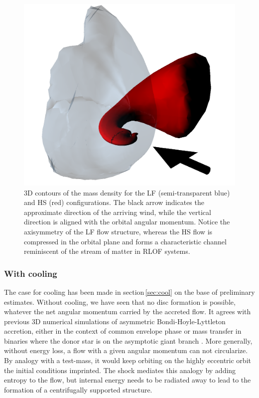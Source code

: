 \documentclass{aa}
\makeatletter
\newcommand*{\rlof}{RLOF\@\xspace}
\makeatother
\begin{document}
\begin{figure}
\centering
\includegraphics[width=0.99\columnwidth]{Pictures/iso-rho_adiab.png}
\caption{3D contours of the mass density for the LF (semi-transparent blue) and HS (red) configurations. The black arrow indicates the approximate direction of the arriving wind, while the vertical direction is aligned with the orbital angular momentum. Notice the axisymmetry of the LF flow structure, whereas the HS flow is compressed in the orbital plane and forms a characteristic channel reminiscent of the stream of matter in \rlof systems.}
\label{fig:3D_adiab}
\end{figure} 

\subsubsection{With cooling}
\label{sec:cool_T}

The case for cooling has been made in section\,\ref{sec:cool} on the base of preliminary estimates. Without cooling, we have seen that no disc formation is possible, whatever the net angular momentum carried by the accreted flow. It agrees with previous 3D numerical simulations of asymmetric Bondi-Hoyle-Lyttleton accretion, either in the context of common envelope phase \citep{MacLeod2014} or mass transfer in binaries where the donor star is on the asymptotic giant branch \citep{Saladino2018}. More generally, without energy loss, a flow with a given angular momentum can not circularize. By analogy with a test-mass, it would keep orbiting on the highly eccentric orbit the initial conditions imprinted. The shock mediates this analogy by adding entropy to the flow, but internal energy needs to be radiated away to lead to the formation of a centrifugally supported structure.
\end{document}
